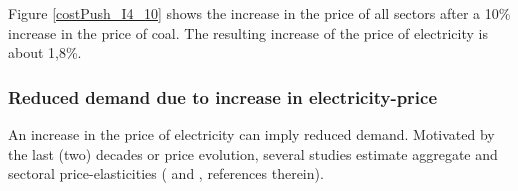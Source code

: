 \documentclass[12pt,english]{article}
\newcommand\lies[2][]{\todo[color=orange!50,#1]{ldf: #2}}
\newcommand\li[1]{\lies[inline]{#1}}
\begin{document}
Figure \ref{costPush_I4_10} shows the increase in the price of all sectors after a 10\% increase in the price of coal. The resulting increase of the price of electricity is about 1,8\%.

\subsubsection{Reduced demand due to increase in electricity-price}

An increase in the price of electricity can imply reduced demand. Motivated by the last (two) decades or price evolution, several studies estimate aggregate and sectoral price-elasticities (\cite{inglesi2010forecasting} and \cite{goliger2018electricity}, references therein). 


%
%
%
%
%
\end{document}
